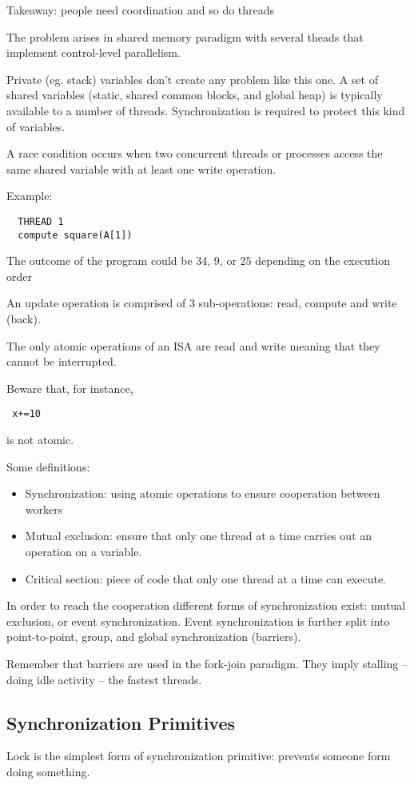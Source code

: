 Takeaway: people need coordination and so do threads

The problem arises in shared memory paradigm with several theads that implement control-level parallelism.

Private (eg. stack) variables don't create any problem like this one.
A set of shared variables (static, shared common blocks, and global heap) is typically available to a number of threads. Synchronization is required to protect this kind of variables.

A race condition occurs when two concurrent threads or processes access the same shared variable with at least one write operation.

Example:
\begin{verbatim}
  THREAD 1
  compute square(A[1])
\end{verbatim}


The outcome of the program could be 34, 9, or 25 depending on the execution order 

An update operation is comprised of 3 sub-operations: read, compute and write (back).

The only atomic operations of an ISA are read and write meaning that they cannot be interrupted.

Beware that, for instance, \begin{verbatim} x+=10 \end{verbatim} is not atomic.

Some definitions:
\begin{itemize}
  \item Synchronization: using atomic operations to ensure cooperation between workers
  \item Mutual exclusion: ensure that only one thread at a time carries out an operation on a variable.
  \item Critical section: piece of code that only one thread at a time can execute.
\end{itemize}

In order to reach the cooperation different forms of synchronization exist: mutual exclusion, or event synchronization.
Event synchronization is further split into point-to-point, group, and global synchronization (barriers).

Remember that barriers are used in the fork-join paradigm. They imply stalling -- doing idle activity -- the fastest threads.

\subsection{Synchronization Primitives}
Lock is the simplest form of synchronization primitive: prevents someone form doing something.

